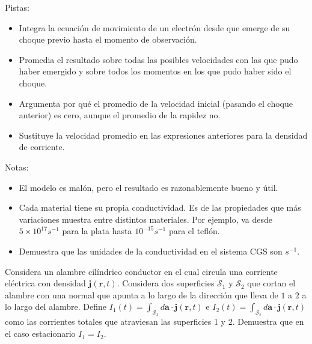 \documentclass{exam}
\begin{document}
\begin{questions}
    Pistas:
    \begin{itemize}
    \item Integra la ecuación de movimiento de un electrón desde que
      emerge de su choque previo hasta el momento de observación.
    \item Promedia el resultado sobre todas las posibles velocidades
      con las que pudo haber emergido y sobre todos los momentos en
      los que pudo haber sido el choque.
    \item Argumenta por qué el promedio de la velocidad inicial
      (pasando el choque anterior) es cero, aunque el promedio de la
      rapidez no.
    \item Sustituye la velocidad promedio en las expresiones
      anteriores para la densidad de corriente.
    \end{itemize}
    Notas:
    \begin{itemize}
    \item El modelo es malón, pero el resultado es razonablemente
      bueno y útil.
    \item Cada material tiene su propia conductividad. Es de las propiedades
      que más variaciones muestra entre distintos materiales. Por
      ejemplo, va desde $5\times 10^{17}s^{-1}$ para la plata hasta
      $10^{-15}s^{-1}$ para el teflón.
    \item  Demuestra que las unidades de la conductividad en el
      sistema CGS son $s^{-1}$.
    \end{itemize}
  \question Considera un alambre cilíndrico conductor en el cual circula una corriente
    eléctrica con densidad $\bm j(\bm r,t)$. Considera dos superficies
    $\mathcal S_1$ y $\mathcal S_2$ que cortan el alambre con una
    normal que apunta a lo largo de la dirección que lleva de
    $1$ a $2$ a lo largo del alambre. Define
    $I_1(t)=\int_{\mathcal S_1}d\bm a\cdot \bm j(\bm r,t)$ e
    $I_2(t)=\int_{\mathcal S_s}d\bm a\cdot\bm j(\bm r,t)$ como las
    corrientes totales que atraviesan las superficies 1 y 2. Demuestra
    que en el caso estacionario $I_1=I_2$.


\end{questions}
\end{document}
